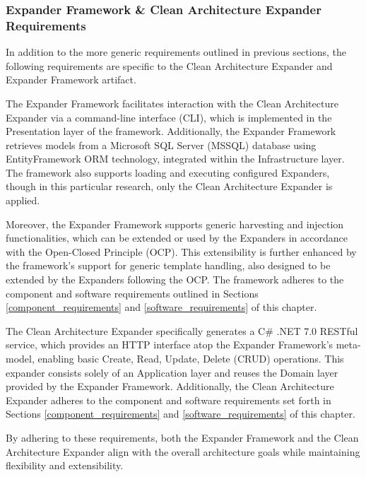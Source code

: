 \subsubsection{Expander Framework \& Clean Architecture Expander Requirements} \label{expander_framework_requirements}

In addition to the more generic requirements outlined in previous sections, the following
requirements are specific to the Clean Architecture Expander and Expander Framework
artifact.

The Expander Framework facilitates interaction with the Clean Architecture Expander via a
command-line interface (CLI), which is implemented in the Presentation layer of the
framework. Additionally, the Expander Framework retrieves models from a Microsoft SQL
Server (MSSQL) database using EntityFramework ORM technology, integrated within the
Infrastructure layer. The framework also supports loading and executing configured
Expanders, though in this particular research, only the Clean Architecture Expander is
applied.

Moreover, the Expander Framework supports generic harvesting and injection
functionalities, which can be extended or used by the Expanders in accordance with the
Open-Closed Principle (OCP). This extensibility is further enhanced by the framework's
support for generic template handling, also designed to be extended by the Expanders
following the OCP. The framework adheres to the component and software requirements
outlined in Sections \ref{component_requirements} and \ref{software_requirements} of this
chapter.

The Clean Architecture Expander specifically generates a C\# .NET 7.0 RESTful service,
which provides an HTTP interface atop the Expander Framework’s meta-model, enabling basic
Create, Read, Update, Delete (CRUD) operations. This expander consists solely of an
Application layer and reuses the Domain layer provided by the Expander Framework.
Additionally, the Clean Architecture Expander adheres to the component and software
requirements set forth in Sections \ref{component_requirements} and
\ref{software_requirements} of this chapter.

By adhering to these requirements, both the Expander Framework and the Clean Architecture
Expander align with the overall architecture goals while maintaining flexibility and
extensibility.
